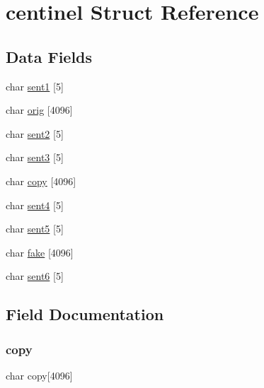 \hypertarget{structcentinel}{}\section{centinel Struct Reference}
\label{structcentinel}
\subsection*{Data Fields}
\begin{DoxyCompactItemize}
\item 
char \hyperlink{structcentinel_a05402765c448b76b8484d6c13b457142}{sent1} \mbox{[}5\mbox{]}
\item 
char \hyperlink{structcentinel_a75c96f740773e2c1189804e32c859f3a}{orig} \mbox{[}4096\mbox{]}
\item 
char \hyperlink{structcentinel_a3e39cf3b7aa2aa3ecce7ab6731ef5e37}{sent2} \mbox{[}5\mbox{]}
\item 
char \hyperlink{structcentinel_a9a38270363ab4061d4a7ee1f34a8b823}{sent3} \mbox{[}5\mbox{]}
\item 
char \hyperlink{structcentinel_a7b3ee1491e087a293ca7fa563a1918bb}{copy} \mbox{[}4096\mbox{]}
\item 
char \hyperlink{structcentinel_a047639e3cc187dcab6b5729856041876}{sent4} \mbox{[}5\mbox{]}
\item 
char \hyperlink{structcentinel_a29e9e21b5605481d92556e86dce0d629}{sent5} \mbox{[}5\mbox{]}
\item 
char \hyperlink{structcentinel_a47ebd8d637af25c475ff071729d54a7f}{fake} \mbox{[}4096\mbox{]}
\item 
char \hyperlink{structcentinel_a0afdd5c01b65f31bf61887e95e4a5553}{sent6} \mbox{[}5\mbox{]}
\end{DoxyCompactItemize}


\subsection{Field Documentation}
\mbox{\label{structcentinel_a7b3ee1491e087a293ca7fa563a1918bb}} 
\subsubsection{\texorpdfstring{copy}{copy}}
{\footnotesize\ttfamily char copy\mbox{[}4096\mbox{]}}

\mbox{\label{structcentinel_a47ebd8d637af25c475ff071729d54a7f}} 
